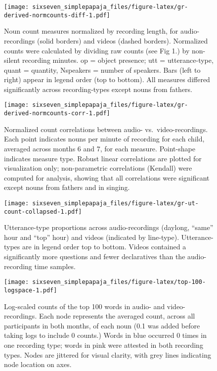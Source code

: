 \documentclass[man]{apa6}
\theoremstyle{definition}
\theoremstyle{definition}
\theoremstyle{definition}
\theoremstyle{remark}
\begin{document}
\begin{figure}
\centering
\texttt{[image: sixseven\_simplepapaja\_files/figure-latex/gr-derived-normcounts-diff-1.pdf]}
\caption{\label{fig:gr-derived-normcounts-diff}Noun count measures
normalized by recording length, for audio-recordings (solid borders) and
videos (dashed borders). Normalized counts were calculated by dividing
raw counts (see Fig 1.) by non-silent recording minutes. op = object
presence; utt = utterance-type, quant = quantity, Nspeakers = number of
speakers. Bars (left to right) appear in legend order (top to bottom).
All measures differed significantly across recording-types except nouns
from fathers.}
\end{figure}

\begin{figure}
\centering
\texttt{[image: sixseven\_simplepapaja\_files/figure-latex/gr-derived-normcounts-corr-1.pdf]}
\caption{\label{fig:gr-derived-normcounts-corr}Normalized count correlations
between audio- vs.~video-recordings. Each point indicates nouns per
minute of recording for each child, averaged across months 6 and 7, for
each measure. Point-shape indicates measure type. Robust linear
correlations are plotted for visualization only; non-parametric
correlations (Kendall) were computed for analysis, showing that all
correlations were significant except nouns from fathers and in singing.}
\end{figure}

\begin{figure}
\centering
\texttt{[image: sixseven\_simplepapaja\_files/figure-latex/gr-ut-count-collapsed-1.pdf]}
\caption{\label{fig:gr-ut-count-collapsed}Utterance-type proportions across
audio-recordings (daylong, \enquote{same} hour and \enquote{top} hour)
and videos (indicated by line-type). Utterance-types are in legend order
top to bottom. Videos contained a significantly more questions and fewer
declaratives than the audio-recording time samples.}
\end{figure}

\begin{figure}
\centering
\texttt{[image: sixseven\_simplepapaja\_files/figure-latex/top-100-logspace-1.pdf]}
\caption{\label{fig:top-100-logspace}Log-scaled counts of the top 100 words
in audio- and video-recordings. Each node represents the averaged count,
across all participants in both months, of each noun (0.1 was added
before taking logs to include 0 counts.) Words in blue occurred 0 times
in one recording type; words in pink were attested in both recording
types. Nodes are jittered for visual clarity, with grey lines indicating
node location on axes.}
\end{figure}
\end{document}
